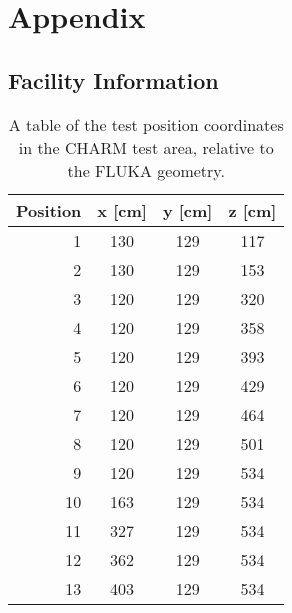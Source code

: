 %

\section{Appendix}
\subsection{Facility Information}

\begin{table}[htbp]
  \centering
    \begin{tabular}{r|c|c|c}
    \textbf{Position} & \textbf{x [cm]} & \textbf{y [cm]} & \textbf{z [cm]} \\
    \hline
    \hline
    1     & 130   & 129   & 117 \\
    2     & 130   & 129   & 153 \\
    3     & 120   & 129   & 320 \\
    4     & 120   & 129   & 358 \\
    5     & 120   & 129   & 393 \\
    6     & 120   & 129   & 429 \\
    7     & 120   & 129   & 464 \\
    8     & 120   & 129   & 501 \\
    9     & 120   & 129   & 534 \\
    10    & 163   & 129   & 534 \\
    11    & 327   & 129   & 534 \\
    12    & 362   & 129   & 534 \\
    13    & 403   & 129   & 534 \\
    \end{tabular}%
    \label{tab:charm_test_pos}
    \caption{A table of the test position coordinates in the CHARM test area, relative to the FLUKA geometry.}
  \label{tab:test_positions}%
\end{table}%
